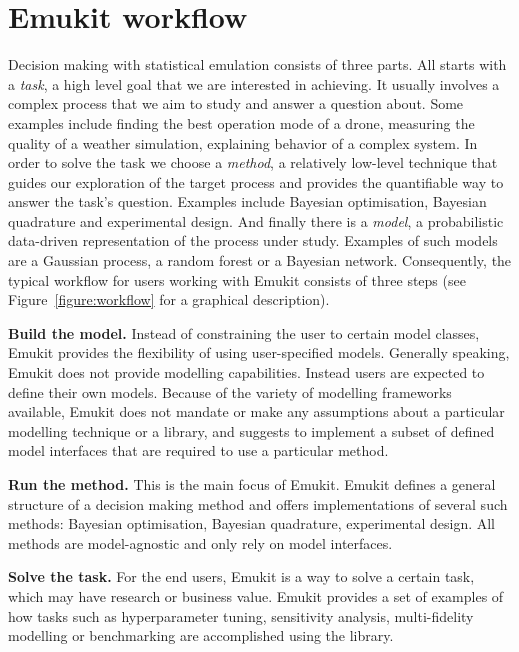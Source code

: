\section{Emukit workflow}\label{sec:workflow}
Decision making with statistical emulation consists of three parts. All starts with a \textit{task}, a high level goal that we are interested in achieving. It usually involves a complex process that we aim to study and answer a question about. Some examples include finding the best operation mode of a drone, measuring the quality of a weather simulation, explaining behavior of a complex system. In order to solve the task we choose a \textit{method}, a relatively low-level technique that guides our exploration of the target process and provides the quantifiable way to answer the task's question. Examples include Bayesian optimisation, Bayesian quadrature and experimental design. And finally there is a \textit{model}, a probabilistic data-driven representation of the process under study. Examples of such models are a Gaussian process, a random forest or a Bayesian network. Consequently, the typical workflow for users working with Emukit consists of three steps (see Figure~\ref{figure:workflow} for a graphical description).

\textbf{Build the model.} Instead of constraining the user to certain model classes, Emukit provides the flexibility of using user-specified models. Generally speaking, Emukit does not provide modelling capabilities. Instead users are expected to define their own models. Because of the variety of modelling frameworks available, Emukit does not mandate or make any assumptions about a particular modelling technique or a library, and suggests to implement a subset of defined model interfaces that are required to use a particular method.

\textbf{Run the method.} This is the main focus of Emukit. Emukit defines a general structure of a decision making method and offers implementations of several such methods: Bayesian optimisation, Bayesian quadrature, experimental design. All methods are model-agnostic and only rely on model interfaces.

\textbf{Solve the task.} For the end users, Emukit is a way to solve a certain task, which may have research or business value. Emukit provides a set of examples of how tasks such as hyperparameter tuning, sensitivity analysis, multi-fidelity modelling or benchmarking are accomplished using the library.

